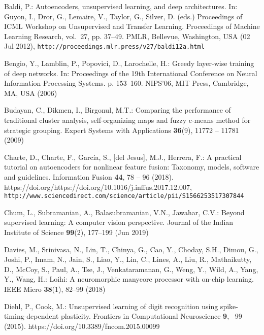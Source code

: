 \documentclass[runningheads]{llncs}
\begin{document}
\begin{thebibliography}{10}
\providecommand{\url}[1]{\texttt{#1}}
\providecommand{\urlprefix}{URL }
\providecommand{\doi}[1]{https://doi.org/#1}

Baldi, P.: Autoencoders, unsupervised learning, and deep architectures. In:
  Guyon, I., Dror, G., Lemaire, V., Taylor, G., Silver, D. (eds.) Proceedings
  of ICML Workshop on Unsupervised and Transfer Learning. Proceedings of
  Machine Learning Research, vol.~27, pp. 37--49. PMLR, Bellevue, Washington,
  USA (02 Jul 2012), \url{http://proceedings.mlr.press/v27/baldi12a.html}

Bengio, Y., Lamblin, P., Popovici, D., Larochelle, H.: Greedy layer-wise
  training of deep networks. In: Proceedings of the 19th International
  Conference on Neural Information Processing Systems. p. 153–160. NIPS’06,
  MIT Press, Cambridge, MA, USA (2006)

Budayan, C., Dikmen, I., Birgonul, M.T.: Comparing the performance of
  traditional cluster analysis, self-organizing maps and fuzzy c-means method
  for strategic grouping. Expert Systems with Applications  \textbf{36}(9),
  11772 -- 11781 (2009)

Charte, D., Charte, F., García, S., [del Jesus], M.J., Herrera, F.: A
  practical tutorial on autoencoders for nonlinear feature fusion: Taxonomy,
  models, software and guidelines. Information Fusion  \textbf{44},  78 -- 96
  (2018). \doi{https://doi.org/10.1016/j.inffus.2017.12.007},
  \url{http://www.sciencedirect.com/science/article/pii/S1566253517307844}

Chum, L., Subramanian, A., Balasubramanian, V.N., Jawahar, C.V.: Beyond
  supervised learning: A computer vision perspective. Journal of the Indian
  Institute of Science  \textbf{99}(2),  177--199 (Jun 2019)

{Davies}, M., {Srinivasa}, N., {Lin}, T., {Chinya}, G., {Cao}, Y., {Choday},
  S.H., {Dimou}, G., {Joshi}, P., {Imam}, N., {Jain}, S., {Liao}, Y., {Lin},
  C., {Lines}, A., {Liu}, R., {Mathaikutty}, D., {McCoy}, S., {Paul}, A.,
  {Tse}, J., {Venkataramanan}, G., {Weng}, Y., {Wild}, A., {Yang}, Y., {Wang},
  H.: Loihi: A neuromorphic manycore processor with on-chip learning. IEEE
  Micro  \textbf{38}(1),  82--99 (2018)

Diehl, P., Cook, M.: Unsupervised learning of digit recognition using
  spike-timing-dependent plasticity. Frontiers in Computational Neuroscience
  \textbf{9}, ~99 (2015). \doi{10.3389/fncom.2015.00099}


\end{thebibliography}
\end{document}
